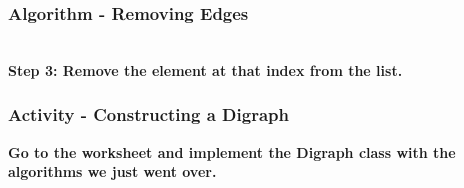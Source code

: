 \documentclass{beamer}
\begin{document}
\begin{frame}[fragile]
    \frametitle{Algorithm - Removing Edges}
    \centering
    \resizebox{0.39\textwidth}{!}{
        
    }
    \vfill\\
    \textbf{Step 3: Remove the element at that index from the list.}
\end{frame}

\begin{frame}[fragile]
    \frametitle{Activity - Constructing a Digraph}
    \textbf{Go to the worksheet and implement the Digraph class with the algorithms we just went over.}
\end{frame}
\end{document}
